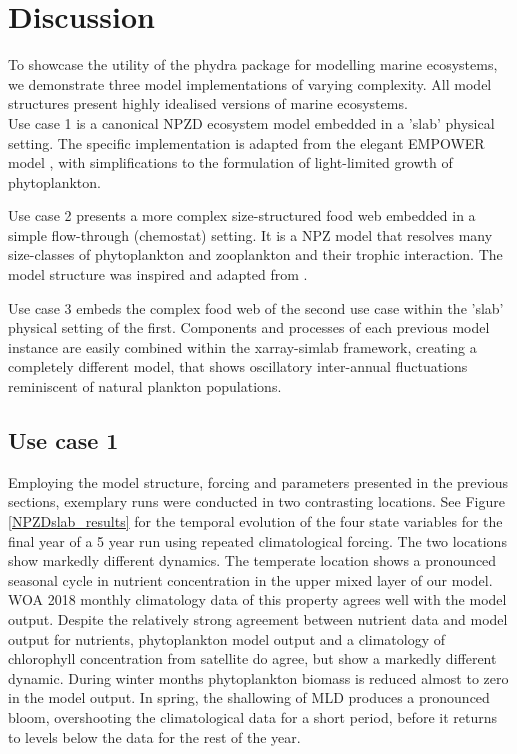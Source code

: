 \documentclass[template.tex]{subfiles}
\begin{document}
\section{Discussion}

\begin{comment}
This is where I can actually discuss the model results, this was my idea how to keep it separate from Section 3, for a clearer reading experience.

\end{comment}

To showcase the utility of the phydra package for modelling marine ecosystems, we demonstrate three model implementations of varying complexity.
All model structures present highly idealised versions of marine ecosystems.\\

Use case 1 is a canonical NPZD ecosystem model embedded in a 'slab' physical setting. The specific implementation is adapted from the elegant EMPOWER model \citep{Anderson2015c}, with simplifications to the formulation of light-limited growth of phytoplankton.

Use case 2 presents a more complex size-structured food web embedded in a simple flow-through (chemostat) setting. It is a NPZ model that resolves many size-classes of phytoplankton and zooplankton and their trophic interaction. The model structure was inspired and adapted from \citet{Banas2011b}. 

Use case 3 embeds the complex food web of the second use case within the 'slab' physical setting of the first. Components and processes of each previous model instance are easily combined within the xarray-simlab framework, creating a completely different model, that shows oscillatory inter-annual fluctuations reminiscent of natural plankton populations. \\


\subsection{Use case 1}

Employing the model structure, forcing and parameters presented in the previous sections, exemplary runs were conducted in two contrasting locations. See Figure \ref{NPZDslab_results} for the temporal evolution of the four state variables for the final year of a 5 year run using repeated climatological forcing. 
The two locations show markedly different dynamics. The temperate location shows a pronounced seasonal cycle in nutrient concentration in the upper mixed layer of our model. WOA 2018 monthly climatology data of this property agrees well with the model output. Despite the relatively strong agreement between nutrient data and model output for nutrients, phytoplankton model output and a climatology of chlorophyll concentration from satellite do agree, but show a markedly different dynamic. During winter months phytoplankton biomass is reduced almost to zero in the model output. In spring, the shallowing of MLD produces a pronounced bloom, overshooting the climatological data for a short period, before it returns to levels below the data for the rest of the year. 
\end{document}
